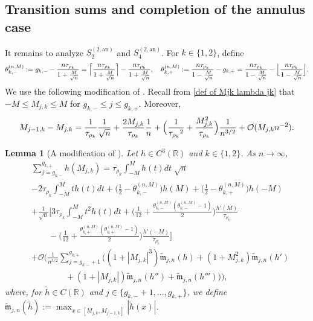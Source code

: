 \documentclass[a4paper]{article}
\newtheorem{lemma}[theorem]{Lemma}
\newcommand{\bigO}{\mathcal{O}}
\numberwithin{equation}{section}
\begin{document}
\subsection{Transition sums and completion of the annulus case}
It remains to analyze $S_2^{(2,\mathrm{an})}$ and $S_4^{(2,\mathrm{an})}$. For $k\in\{1,2\}$, define
\[
\theta_{k,-}^{(n,M)}:=g_{k,-}-\frac{n\tau_{\rho_k}}{1+\frac{M}{\sqrt{n}}}=\Bigl\lceil\frac{n\tau_{\rho_k}}{1+\frac{M}{\sqrt{n}}}\Bigr\rceil-\frac{n\tau_{\rho_k}}{1+\frac{M}{\sqrt{n}}},
\quad
\theta_{k,+}^{(n,M)}:=\frac{n\tau_{\rho_k}}{1-\frac{M}{\sqrt{n}}}   -g_{k,+}=\frac{n\tau_{\rho_k}}{1-\frac{M}{\sqrt{n}}}-\Bigl\lfloor\frac{n\tau_{\rho_k}}{1-\frac{M}{\sqrt{n}}}\Bigr\rfloor.
\]
We use the following modification of \cite[Lemma~2.7]{C2021 FH}. Recall from \eqref{def of Mjk lambda jk} that $-M\leq M_{j,k}\leq M$ for $g_{k,-}\leq j\leq g_{k,+}$. Moreover,
\begin{equation}
M_{j-1,k}-M_{j,k}=\frac{1}{\tau_{\rho_k}}\frac{1}{\sqrt{n}}+\frac{2M_{j,k}}{\tau_{\rho_k}}\frac{1}{n}+\Bigl(\frac{1}{{\tau_{\rho_k}}^2}+\frac{M_{j,k}^2}{\tau_{\rho_k}}\Bigr)\frac{1}{n^{3/2}}+\mathcal{O}(M_{j,k}n^{-2}).
\end{equation}
\begin{lemma}[{A modification of \cite[Lemma~2.7]{C2021 FH}}]\label{lemma:Riemann sum}
Let $h\in C^3(\mathbb R)$ and $k\in\{1,2\}$. As $n\to\infty$,
\begin{align}
& \sum_{j=g_{k,-}}^{g_{k,+}}h(M_{j,k}) = \tau_{\rho_k} \int_{-M}^{M} h(t) dt \; \sqrt{n} \nonumber \\
& - 2 \tau_{\rho_k} \int_{-M}^{M} th(t) dt + \bigg( \frac{1}{2}-\theta_{k,-}^{(n,M)} \bigg)h(M)+ \bigg( \frac{1}{2}-\theta_{k,+}^{(n,M)} \bigg)h(-M) \nonumber \\
& + \frac{1}{\sqrt{n}}\bigg[ 3\tau_{\rho_k} \int_{-M}^{M}t^{2}h(t)dt + \bigg( \frac{1}{12}+\frac{\theta_{k,-}^{(n,M)}(\theta_{k,-}^{(n,M)}-1)}{2} \bigg)\frac{h'(M)}{\tau_{\rho_k}} \nonumber \\
&\qquad - \bigg( \frac{1}{12}+\frac{\theta_{k,+}^{(n,M)}(\theta_{k,+}^{(n,M)}-1)}{2} \bigg)\frac{h'(-M)}{\tau_{\rho_k}} \bigg] \nonumber \\
& + \bigO\Bigg(  \frac{1}{n^{3/2}} \sum_{j=g_{k,-}+1}^{g_{k,+}} \bigg( (1+|M_{j,k}|^{3}) \tilde{\mathfrak{m}}_{j,n}(h) + (1+M_{j,k}^{2})\tilde{\mathfrak{m}}_{j,n}(h') \nonumber \\
&\qquad\qquad + (1+|M_{j,k}|) \tilde{\mathfrak{m}}_{j,n}(h'') + \tilde{\mathfrak{m}}_{j,n}(h''') \bigg)   \Bigg), \label{sum f asymp 2}
\end{align}
where, for $\tilde{h} \in C(\mathbb{R})$ and $j \in \{g_{k,-}+1,\ldots,g_{k,+}\}$, we define $\tilde{\mathfrak{m}}_{j,n}(\tilde{h}) := \max_{x \in [M_{j,k},M_{j-1,k}]}|\tilde{h}(x)|$.
\end{lemma}
\end{document}
